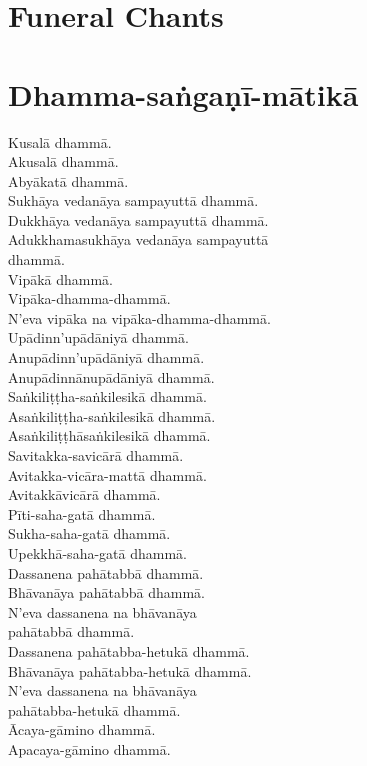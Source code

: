 \chapter{Funeral Chants}

\chapter{Dhamma-saṅgaṇī-mātikā}

Kusalā dhammā.\\
Akusalā dhammā.\\
Abyākatā dhammā.\\
Sukhāya vedanāya sampayuttā dhammā.\\
Dukkhāya vedanāya sampayuttā dhammā.\\
Adukkhamasukhāya vedanāya sampayuttā\\
dhammā.\\
Vipākā dhammā.\\
Vipāka-dhamma-dhammā.\\
N'eva vipāka na vipāka-dhamma-dhammā.\\
Upādinn'upādāniyā dhammā.\\
Anupādinn'upādāniyā dhammā.\\
Anupādinnānupādāniyā dhammā.\\
Saṅkiliṭṭha-saṅkilesikā dhammā.\\
Asaṅkiliṭṭha-saṅkilesikā dhammā.\\
Asaṅkiliṭṭhāsaṅkilesikā dhammā.\\
Savitakka-savicārā dhammā.\\
Avitakka-vicāra-mattā dhammā.\\
Avitakkāvicārā dhammā.\\
Pīti-saha-gatā dhammā.\\
Sukha-saha-gatā dhammā.\\
Upekkhā-saha-gatā dhammā.\\
Dassanena pahātabbā dhammā.\\
Bhāvanāya pahātabbā dhammā.\\
N'eva dassanena na bhāvanāya\\
pahātabbā dhammā.\\
Dassanena pahātabba-hetukā dhammā.\\
Bhāvanāya pahātabba-hetukā dhammā.\\
N'eva dassanena na bhāvanāya\\
pahātabba-hetukā dhammā.\\
Ācaya-gāmino dhammā.\\
Apacaya-gāmino dhammā.\\

